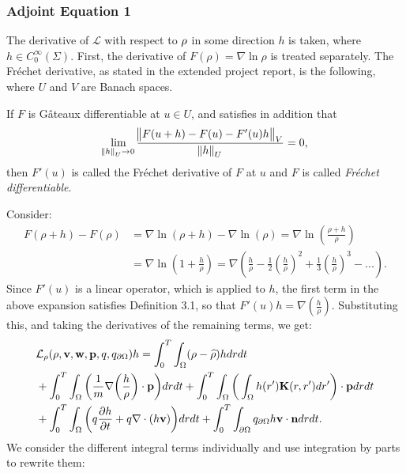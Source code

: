 \subsubsection{Adjoint Equation 1}

The derivative of $\mathcal{L}$ with respect to $\rho$ in some direction $h$ is taken, where ${h} \in C_0^\infty(\Sigma) $.
First, the derivative of $F(\rho) = \nabla \ln \rho $ is treated separately. The Fr\'echet derivative, as stated in the extended project report, is the following, where $U$ and $V$ are Banach spaces.
\theoremstyle{definition}
\begin{definition}\cite{DeLosReyesOptimization}
	If $F$ is G\^{a}teaux differentiable at $u \in U$, and satisfies in addition that
	\begin{align*}
	\lim_{\norm{h}_U \to 0} \frac{\norm{F(u+h)-F(u) -F'(u)h}_V}{\norm{h}_U}=0,
	\end{align*}
	then $F'(u)$ is called the Fr\'echet derivative of $F$ at $u$ and $F$ is called \emph{Fr\'echet differentiable}.
\end{definition}
Consider:
\begin{align*}
F(\rho + h) - F(\rho) &= \nabla \ln(\rho +h) - \nabla \ln(\rho)  = \nabla \ln \left(\frac{\rho + h}{\rho}\right) \\
&= \nabla \ln\left(1 + \frac{h}{\rho}\right) = \nabla \left(\frac{h}{\rho} - \frac{1}{2}\left(\frac{h}{\rho}\right)^2 + \frac{1}{3}\left(\frac{h}{\rho}\right)^3 - ...\right).
\end{align*}
Since $F'(u)$ is a linear operator, which is applied to $h$, the first term in the above expansion satisfies Definition 3.1, so that $F'(u)h = \nabla \left(\frac{h}{\rho} \right)$. 
Substituting this, and taking the derivatives of the remaining terms, we get:
\begin{align*}
&\mathcal{L}_\rho(\rho,\mathbf{v},\mathbf{w},\mathbf{p},q,{q}_{\partial \Omega})h = \int_0^T \int_\Omega  (\rho - \widehat {\rho})h drdt \\
&+ \int_0^T \int_\Omega \bigg( \frac{1}{m}\nabla \bigg(\frac{h}{\rho}\bigg)\cdot \mathbf{p} \bigg)  dr dt + \int_0^T \int_\Omega \bigg(\int_\Omega h(r') \mathbf{K}(r,r') dr'\bigg) \cdot \mathbf{p} dr dt\\
& + \int_0^T \int_\Omega \bigg(q\frac{\partial h}{\partial t} + q\nabla \cdot (h \mathbf{v})\bigg)  dr dt +\int_0^T \int_{\partial\Omega} {q}_{\partial \Omega} h\mathbf{v} \cdot \mathbf{n}  dr dt.
\end{align*}
We consider the different integral terms individually and use integration by parts to rewrite them:
